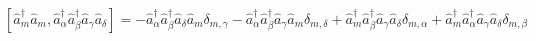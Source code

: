 \documentclass[12pt]{article}
\begin{document}
  \begin{dmath*}
    \left[ \hat{a}^\dagger_{m} \hat{a}_{m}, \hat{a}^\dagger_{\alpha} \hat{a}^\dagger_{\beta} \hat{a}_{\gamma} \hat{a}_{\delta} \right] = -\hat{a}^\dagger_{\alpha} \hat{a}^\dagger_{\beta} \hat{a}_{\delta} \hat{a}_{m} \delta_{m,\gamma}-\hat{a}^\dagger_{\alpha} \hat{a}^\dagger_{\beta} \hat{a}_{\gamma} \hat{a}_{m} \delta_{m,\delta}+\hat{a}^\dagger_{m} \hat{a}^\dagger_{\beta} \hat{a}_{\gamma} \hat{a}_{\delta} \delta_{m,\alpha}+\hat{a}^\dagger_{m} \hat{a}^\dagger_{\alpha} \hat{a}_{\gamma} \hat{a}_{\delta} \delta_{m,\beta}
  \end{dmath*}
\end{document}
